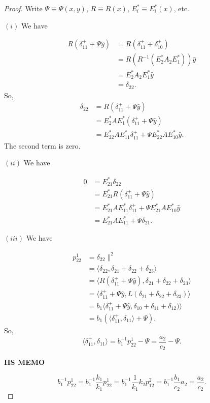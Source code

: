 \documentclass[
]{book}
\theoremstyle{definition}
\theoremstyle{definition}
\theoremstyle{definition}
\theoremstyle{definition}
\theoremstyle{remark}
\begin{document}
\begin{proof}

Write \(\Psi \equiv \Psi(x,y)\), \(R \equiv R(x)\), \(E^*_i \equiv E^*_i(x)\), etc.

\((i)\) We have

\begin{align}
R(\delta^+_{11} + \Psi \hat{y}) & = R(\delta^+_{11} + \delta^+_{10})\\
& = R(R^{-1}(E^*_2A_2E^*_1))\hat{y}\\
& = E^*_2A_2E^*_1\hat{y}\\
& = \delta_{22}.
\end{align}
So,
\begin{align}
\delta_{22} & = R(\delta^+_{11} + \Psi \hat{y})\\
& = E^*_2AE^*_1(\delta^+_{11} + \Psi \hat{y})\\
& = E^*_{22}AE^*_{11}\delta^+_{11} + \Psi E^*_{22}A E^*_{10}\hat{y}.
\end{align}
The second term is zero.

\((ii)\) We have

\begin{align}
0 & = E^*_{21}\delta_{22}\\
& = E^*_{21}R(\delta^+_{11} + \Psi \hat{y})\\
& = E^*_{21}AE^*_{11}\delta^+_{11} + \Psi E^*_{21}AE^*_{10}\hat{y}\\
& = E^*_{21}AE^*_{11} + \Psi \delta_{21}.
\end{align}

\((iii)\) We have

\begin{align}
p^{1}_{22} & = \delta_{22}\|^2 \\
& = \langle \delta_{22}, \delta_{21}+\delta_{22}+\delta_{23}\rangle\\
& = \langle R(\delta^+_{11} + \Psi \hat{y}), \delta_{21}+\delta_{22}+\delta_{23}\rangle\\
& = \langle \delta^+_{11} + \Psi \hat{y}, L(\delta_{21}+\delta_{22}+\delta_{23})\rangle\\
& = b_1\langle \delta^+_{11} + \Psi \hat{y}, \delta_{10}+\delta_{11}+\delta_{12})\rangle\\
& = b_1(\langle \delta^+_{11}, \delta_{11}\rangle + \Psi).
\end{align}
So,
\[\langle \delta^+_{11}, \delta_{11}\rangle = b_1^{-1}p^{1}_{22}- \Psi = \frac{a_2}{c_2}-\Psi.\]

\textbf{HS MEMO}

\[b^{-1}_1p^1_{22} = b^{-1}_1\frac{k_1}{k_1}p^1_{22} = b^{-1}_1\frac{1}{k_1}k_2p^{2}_{12} = b^{-1}_1\frac{b_1}{c_2}a_2 = \frac{a_2}{c_2}.\]


\end{proof}
\end{document}
